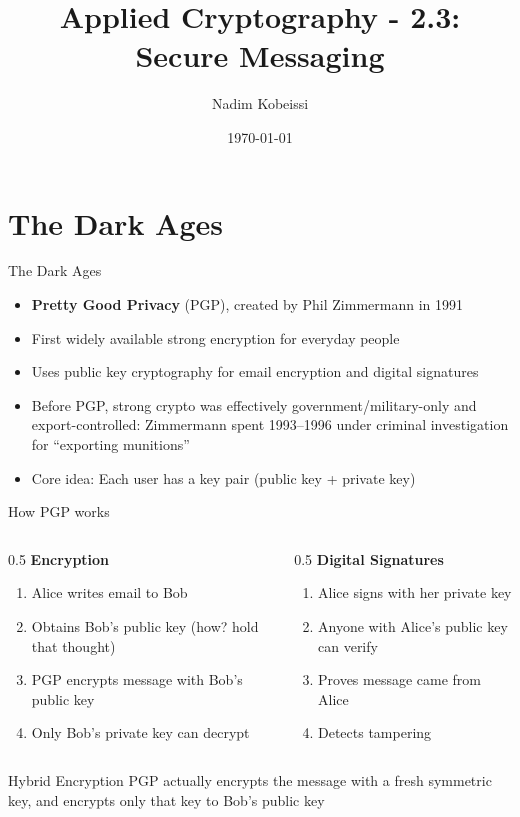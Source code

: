 \ifdefined\PRESENTATION\else\PassOptionsToClass{handout}{beamer}\fi\documentclass[aspectratio=169, lualatex]{beamer}
\title{Applied Cryptography - 2.3: Secure Messaging}
\author{Nadim Kobeissi}
\institute{Symbolic Software}
\date{\today}
\begin{document}
\begin{frame}[plain]
	\titlepage
\end{frame}

\section{The Dark Ages}

\begin{frame}{The Dark Ages}
	\begin{itemize}
		\item \textbf{Pretty Good Privacy} (PGP), created by Phil Zimmermann in 1991
		\item First widely available strong encryption for everyday people
		\item Uses public key cryptography for email encryption and digital signatures
		\item Before PGP, strong crypto was effectively government/military-only and export-controlled: Zimmermann spent 1993--1996 under criminal investigation for ``exporting munitions''
		\item Core idea: Each user has a key pair (public key + private key)
	\end{itemize}
\end{frame}

\begin{frame}{How PGP works}
	\begin{columns}
		\begin{column}{0.5\textwidth}
			\textbf{Encryption}
			\begin{enumerate}
				\item Alice writes email to Bob
				\item Obtains Bob's public key (how? hold that thought)
				\item PGP encrypts message with Bob's public key
				\item Only Bob's private key can decrypt
			\end{enumerate}
		\end{column}
		\begin{column}{0.5\textwidth}
			\textbf{Digital Signatures}
			\begin{enumerate}
				\item Alice signs with her private key
				\item Anyone with Alice's public key can verify
				\item Proves message came from Alice
				\item Detects tampering
			\end{enumerate}
		\end{column}
	\end{columns}
	\begin{alertblock}{Hybrid Encryption}
		PGP actually encrypts the message with a fresh symmetric key, and encrypts only that key to Bob's public key
	\end{alertblock}
\end{frame}
\end{document}
